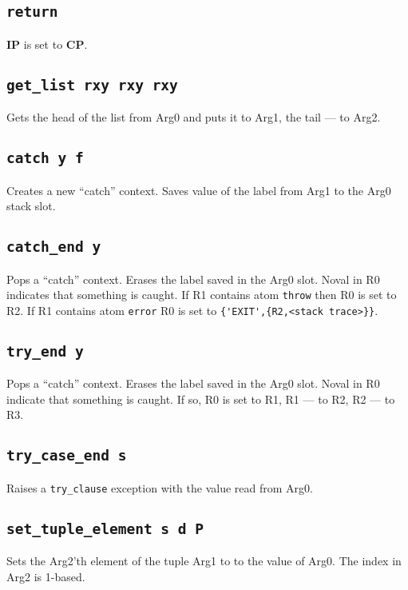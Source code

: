 \documentclass{article}
\newcommand{\ip}{\textbf{IP}}
\newcommand{\cp}{\textbf{CP}}
\newcommand{\iop}[1]{\texttt{#1}}
\begin{document}
\subsection*{\iop{return}}

\ip{} is set to \cp{}.

\subsection*{\iop{get\_list rxy rxy rxy}}

Gets the head of the list from Arg0 and puts it to Arg1, the tail --- to Arg2.

\subsection*{\iop{catch y f}}

Creates a new ``catch'' context. Saves value of the label from Arg1 to the Arg0 stack
slot.

\subsection*{\iop{catch\_end y}}

Pops a ``catch'' context. Erases the label saved in the Arg0 slot. Noval in R0
indicates that something is caught. If R1 contains atom \verb$throw$ then R0 is
set to R2. If R1 contains atom \verb$error$ R0 is set to
\verb${'EXIT',{R2,<stack trace>}}$.

\subsection*{\iop{try\_end y}}

Pops a ``catch'' context. Erases the label saved in the Arg0 slot. Noval in R0
indicate that something is caught. If so, R0 is set to R1, R1 --- to R2, R2 ---
to R3.

\subsection*{\iop{try\_case\_end s}}

Raises a \verb$try_clause$ exception with the value read from Arg0.

\subsection*{\iop{set\_tuple\_element s d P}}

Sets the Arg2'th element of the tuple Arg1 to to the value of Arg0. The index in
Arg2 is 1-based.
\end{document}
